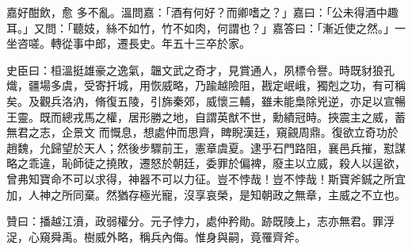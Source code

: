 \begin{pinyinscope}
 嘉好酣飲，愈
 多不亂。溫問嘉：「酒有何好？而卿嗜之？」嘉曰：「公未得酒中趣耳。」又問：「聽妓，絲不如竹，竹不如肉，何謂也？」嘉答曰：「漸近使之然。」一坐咨嗟。轉從事中郎，遷長史。年五十三卒於家。



 史臣曰：桓溫挺雄豪之逸氣，韞文武之奇才，見賞通人，夙標令譽。時既豺狼孔熾，疆場多虞，受寄扞城，用恢威略，乃踰越險阻，戡定岷峨，獨剋之功，有可稱矣。及觀兵洛汭，脩復五陵，引旆秦郊，威懷三輔，雖未能梟除兇逆，亦足以宣暢王靈。既而總戎馬之權，居形勝之地，自謂英猷不世，勳績冠時。挾震主之威，蓄無君之志，企景文
 而慨息，想處仲而思齊，睥睨漢廷，窺覦周鼎。復欲立奇功於趙魏，允歸望於天人；然後步驟前王，憲章虞夏。逮乎石門路阻，襄邑兵摧，懟謀略之乖違，恥師徒之撓敗，遷怒於朝廷，委罪於偏裨，廢主以立威，殺人以逞欲，曾弗知寶命不可以求得，神器不可以力征。豈不悖哉！豈不悖哉！斯寶斧鋮之所宜加，人神之所同棄。然猶存極光寵，沒享哀榮，是知朝政之無章，主威之不立也。



 贊曰：播越江濆，政弱權分。元子悖力，處仲矜勛。跡既陵上，志亦無君。罪浮浞，心窺舜禹。樹威外略，稱兵內侮。惟身與嗣，竟罹齊斧。



\end{pinyinscope}